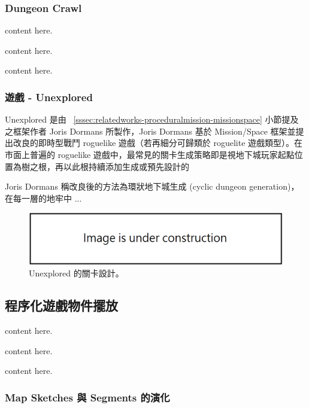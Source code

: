 \subsubsection{Dungeon Crawl}
\label{sssec:relatedworks-proceduralmission-dungeoncrawl}

content here.

content here.

content here.

\subsubsection{遊戲 - Unexplored}
\label{sssec:relatedworks-proceduralmission-unexplored}

Unexplored 是由 ~\ref{sssec:relatedworks-proceduralmission-missionspace} 小節提及之框架作者 Joris Dormans 所製作，Joris Dormans 基於 Mission/Space 框架並提出改良的即時型戰鬥 roguelike 遊戲（若再細分可歸類於 roguelite 遊戲類型）。在市面上普遍的 roguelike 遊戲中，最常見的關卡生成策略即是視地下城玩家起點位置為樹之根，再以此根持續添加生成或預先設計的

Joris Dormans 稱改良後的方法為環狀地下城生成 (cyclic dungeon generation)，在每一層的地牢中 ...

\begin{figure}[h]
  \begin{center}
    \includegraphics[width=1.0\textwidth]{figures/under_construction.png}
    \caption{Unexplored 的關卡設計。} 
    \label{fig:unexplored}
  \end{center}
\end{figure}

\subsection{程序化遊戲物件擺放}
\label{ssec:relatedworks-proceduralgamepatterns}

content here.

content here.

content here.

\subsubsection{Map Sketches 與 Segments 的演化}
\label{sssec:relatedworks-proceduralgamepatterns-mapsketches}


